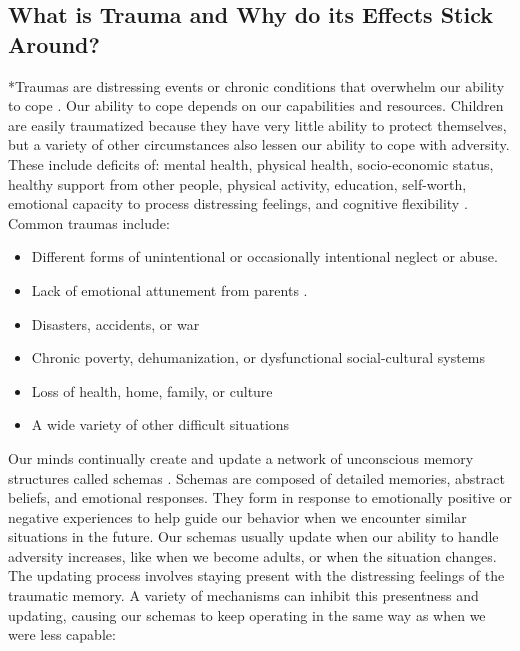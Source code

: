 \documentclass[12pt,letterpaper]{book}
\begin{document}
\subsection{What is Trauma and Why do its Effects Stick Around?}
*Traumas are distressing events or chronic conditions that overwhelm our ability to cope \cite{laneReconsolidation}. Our ability to cope depends on our capabilities and resources. Children are easily traumatized because they have very little ability to protect themselves, but a variety of other circumstances also lessen our ability to cope with adversity.  These include deficits of: mental health, physical health, socio-economic status, healthy support from other people, physical activity, education, self-worth, emotional capacity to process distressing feelings, and cognitive flexibility \cite{sayedRiskFactors,tangRiskFactors,trickeyRiskFactors}. Common traumas include:
\begin{itemize}
    \item Different forms of unintentional or occasionally intentional neglect or abuse.
    \item Lack of emotional attunement from parents \cite{brownAttachmentDisturbances}.
    \item Disasters, accidents, or war
    \item Chronic poverty, dehumanization, or dysfunctional social-cultural systems \cite{roncaStructuralViolence}
    \item Loss of health, home, family, or culture
    \item A wide variety of other difficult situations
\end{itemize}
Our minds continually create and update a network of unconscious memory structures called schemas \cite{eckerUnlocking}. Schemas are composed of detailed memories, abstract beliefs, and emotional responses. They form in response to emotionally positive or negative experiences to help guide our behavior when we encounter similar situations in the future.  Our schemas usually update when our ability to handle adversity increases, like when we become adults, or when the situation changes. The updating process involves staying present with the distressing feelings of the traumatic memory. A variety of mechanisms can inhibit this presentness and updating, causing our schemas to keep operating in the same way as when we were less capable:
\end{document}
